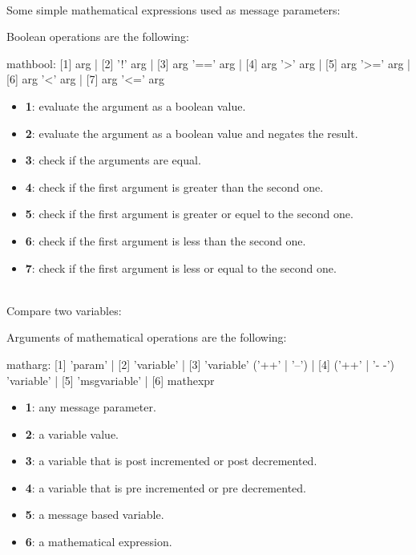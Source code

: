 \example\\
Some simple mathematical expressions used as message parameters:

Boolean operations are the following:


\begin{rail}
mathbool:     [1] arg
			| [2] '!' arg
			| [3] arg '==' arg
			| [4] arg '>' arg
			| [5] arg '>=' arg
			| [6] arg '<' arg
			| [7] arg '<=' arg
\end{rail}

\begin{itemize}
\item \textbf{1}: evaluate the argument as a boolean value.
\item \textbf{2}: evaluate the argument as a boolean value and negates the result.
\item \textbf{3}: check if the arguments are equal.
\item \textbf{4}: check if the first argument is greater than the second one.
\item \textbf{5}: check if the first argument is greater or equel to the second one.
\item \textbf{6}: check if the first argument is less than the second one.
\item \textbf{7}: check if the first argument is less or equal to the second one.
\end{itemize}

\example\\
Compare two variables:


\label{mathargs}

Arguments of mathematical operations are the following:


\begin{rail}
matharg:      [1] 'param'
			| [2] 'variable'
			| [3] 'variable' ('++' | '--')
			| [4] ('++' | '- -') 'variable' 
			| [5] 'msgvariable'
			| [6] mathexpr
\end{rail}

\begin{itemize}
\item \textbf{1}: any message parameter.
\item \textbf{2}: a variable value.
\item \textbf{3}: a variable that is post incremented or post decremented.
\item \textbf{4}: a variable that is pre incremented or pre decremented.
\item \textbf{5}: a message based variable.
\item \textbf{6}: a mathematical expression.
\end{itemize}



